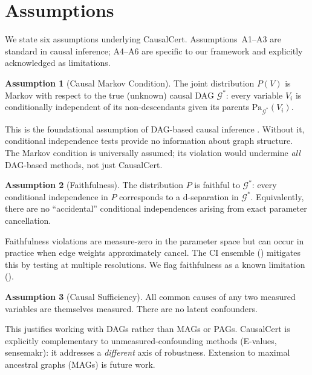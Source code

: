\documentclass[11pt,a4paper]{article}
\theoremstyle{definition}
\newtheorem{assumption}{Assumption}
\theoremstyle{remark}
\newcommand{\DAG}{\mathcal{G}}
\newcommand{\Pa}{\mathrm{Pa}}
\begin{document}
\section{Assumptions}\label{sec:assumptions}

We state six assumptions underlying CausalCert. Assumptions~A1--A3 are standard in
causal inference; A4--A6 are specific to our framework and explicitly acknowledged as
limitations.

\begin{assumption}[Causal Markov Condition]\label{asm:markov}
The joint distribution $P(V)$ is Markov with respect to the true (unknown) causal DAG
$\DAG^*$: every variable $V_i$ is conditionally independent of its non-descendants
given its parents $\Pa_{\DAG^*}(V_i)$.
\end{assumption}

This is the foundational assumption of DAG-based causal inference
\cite{pearl2009,spirtes2000}. Without it, conditional independence tests provide no
information about graph structure. The Markov condition is universally assumed; its
violation would undermine \emph{all} DAG-based methods, not just CausalCert.

\begin{assumption}[Faithfulness]\label{asm:faithful}
The distribution $P$ is faithful to $\DAG^*$: every conditional independence in $P$
corresponds to a d-separation in $\DAG^*$. Equivalently, there are no ``accidental''
conditional independences arising from exact parameter cancellation.
\end{assumption}

Faithfulness violations are measure-zero in the parameter space \cite{meek1995} but can
occur in practice when edge weights approximately cancel. The CI ensemble
() mitigates this by testing at multiple resolutions. We flag
faithfulness as a known limitation ().

\begin{assumption}[Causal Sufficiency]\label{asm:sufficiency}
All common causes of any two measured variables are themselves measured. There are no
latent confounders.
\end{assumption}

This justifies working with DAGs rather than MAGs or PAGs. CausalCert is explicitly
complementary to unmeasured-confounding methods (E-values, sensemakr): it addresses a
\emph{different} axis of robustness. Extension to maximal ancestral graphs (MAGs) is
future work.
\end{document}
